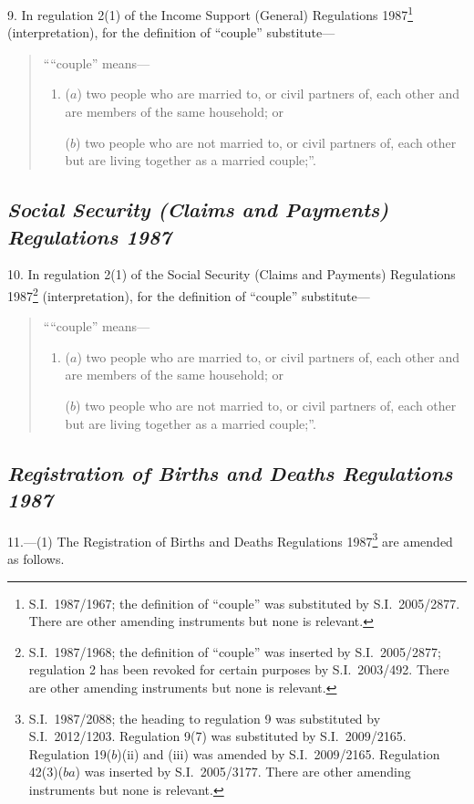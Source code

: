 \documentclass[12pt,a4paper]{article}
\begin{document}
9.  In regulation 2(1) of the Income Support (General) Regulations 1987\footnote{S.I.~1987/1967; the definition of “couple” was substituted by S.I.~2005/2877. There are other amending instruments but none is relevant.} (interpretation), for the definition of “couple” substitute—
\begin{quotation}
““couple” means—
\begin{enumerate}\item[]
($a$) 
two people who are married to, or civil partners of, each other and are members of the same household; or

($b$) 
two people who are not married to, or civil partners of, each other but are living together as a married couple;”.
\end{enumerate}
\end{quotation}

\subsection*{\itshape Social Security (Claims and Payments) Regulations 1987}

10.  In regulation 2(1) of the Social Security (Claims and Payments) Regulations 1987\footnote{S.I.~1987/1968; the definition of “couple” was inserted by S.I.~2005/2877; regulation 2 has been revoked for certain purposes by S.I.~2003/492. There are other amending instruments but none is relevant.} (interpretation), for the definition of “couple” substitute—
\begin{quotation}
““couple” means—
\begin{enumerate}\item[]
($a$) 
two people who are married to, or civil partners of, each other and are members of the same household; or

($b$) 
two people who are not married to, or civil partners of, each other but are living together as a married couple;”.
\end{enumerate}
\end{quotation}

\subsection*{\itshape Registration of Births and Deaths Regulations 1987}

11.—(1) The Registration of Births and Deaths Regulations 1987\footnote{S.I.~1987/2088; the heading to regulation 9 was substituted by S.I.~2012/1203. Regulation 9(7) was substituted by S.I.~2009/2165. Regulation 19($b$)(ii)  and (iii)  was amended by S.I.~2009/2165. Regulation 42(3)($ba$) was inserted by S.I.~2005/3177. There are other amending instruments but none is relevant.} are amended as follows.
\end{document}
